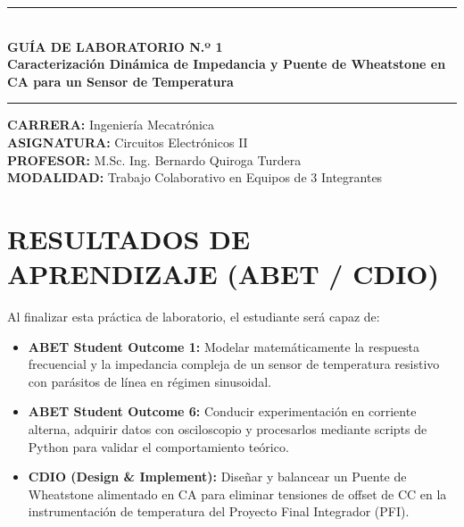 \documentclass[11pt,a4paper]{article}
\begin{document}
\begin{center}
    \rule{\textwidth}{1pt}\\[0.3cm]
    {\LARGE \textbf{GUÍA DE LABORATORIO N.º 1}}\\[0.2cm]
    {\Large \textbf{Caracterización Dinámica de Impedancia y Puente de Wheatstone en CA para un Sensor de Temperatura}}\\[0.2cm]
    \rule{\textwidth}{1pt}
\end{center}

\vspace{0.2cm}
\noindent\textbf{CARRERA:} Ingeniería Mecatrónica\\
\textbf{ASIGNATURA:} Circuitos Electrónicos II\\
\textbf{PROFESOR:} M.Sc. Ing. Bernardo Quiroga Turdera\\
\textbf{MODALIDAD:} Trabajo Colaborativo en Equipos de 3 Integrantes

\vspace{0.5cm}
\section{RESULTADOS DE APRENDIZAJE (ABET / CDIO)}
Al finalizar esta práctica de laboratorio, el estudiante será capaz de:
\begin{itemize}[label=$\bullet$]
    \item \textbf{ABET Student Outcome 1:} Modelar matemáticamente la respuesta frecuencial y la impedancia compleja de un sensor de temperatura resistivo con parásitos de línea en régimen sinusoidal.
    \item \textbf{ABET Student Outcome 6:} Conducir experimentación en corriente alterna, adquirir datos con osciloscopio y procesarlos mediante scripts de Python para validar el comportamiento teórico.
    \item \textbf{CDIO (Design \& Implement):} Diseñar y balancear un Puente de Wheatstone alimentado en CA para eliminar tensiones de offset de CC en la instrumentación de temperatura del Proyecto Final Integrador (PFI).
\end{itemize}

\end{document}
